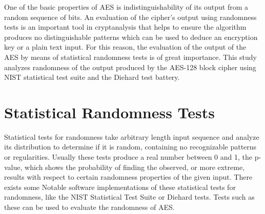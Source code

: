 \documentclass[conference]{IEEEtran}
\begin{document}
One of the basic properties of AES is indistinguishability of its output from a random sequence of bits. An evaluation of the cipher's output using randomness tests is an important tool in cryptanalysis that helps to ensure the algorithm produces no distinguishable patterns which can be used to deduce an encryption key or a plain text input. For this reason, the evaluation of the output of the AES by means of statistical randomness tests is of great importance. This study analyzes randomness
of the output produced by the AES-128 block cipher using NIST statistical test suite and  the Diehard test battery.
\section{Statistical Randomness Tests}

Statistical tests for randomness take arbitrary length input sequence and analyze its distribution to determine if it is random, containing no recognizable patterns or regularities. Usually these tests produce a real number between 0 and 1, the p-value, which shows the probability of finding the observed, or more extreme, results with respect to certain randomness properties of the given input. There exists some Notable software implementations of these statistical tests for randomness, like
the NIST Statistical Test Suite or Diehard tests. Tests such as these can be used to evaluate the randomness of AES.
\end{document}

